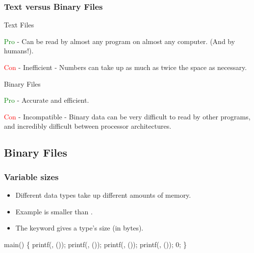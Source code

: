 \documentclass[smaller,table]{beamer} %
\begin{document}
\begin{frame}
\frametitle{Text versus Binary Files}
\begin{block}{Text Files}
\begin{itemize}
{
\item \textcolor{green}{Pro} - Can be read by almost any program on almost any computer. (And by humans!).
}
{
\item \textcolor{red}{Con} - Inefficient - Numbers can take up as much as twice the space as necessary.}
\end{itemize}
\end{block}

\begin{block}{Binary Files}
\begin{itemize}
{
\item \textcolor{green}{Pro} - Accurate and efficient.
}
{
\item \textcolor{red}{Con} - Incompatible - Binary data can be very difficult to read by other programs, and incredibly difficult between processor architectures.}
\end{itemize}
\end{block}
\end{frame}

\subsection{Binary Files}
\begin{frame}[fragile]
\frametitle{Variable sizes}
\begin{itemize}
\item Different data types take up different amounts of memory.
\item Example  is smaller than .
\item The  keyword gives a type's size (in bytes).
\end{itemize}

{
\small
\begin{semiverbatim}
 

 main()
\{
   printf(, ());
   printf(, ());
   printf(, ());
   printf(, ());
    0;
\}
\end{semiverbatim}
}
\end{frame}
\end{document}

